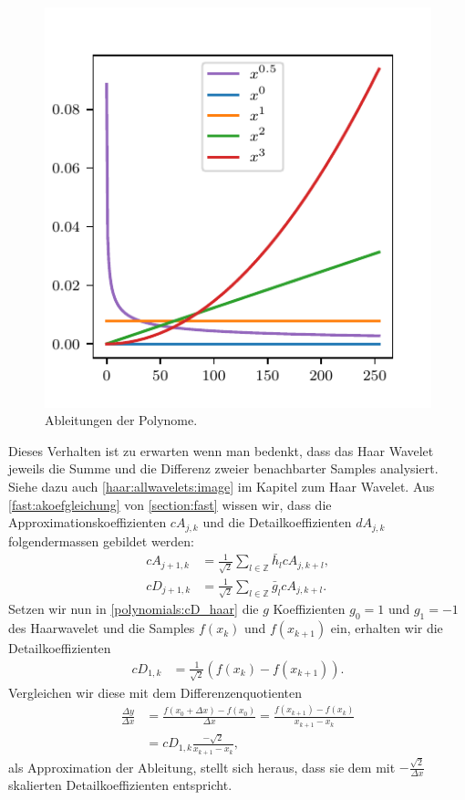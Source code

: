 \begin{refsection}
\begin{figure}
    \centering
    \includegraphics{papers/polynomials/images/polynomials_signals_diff.pdf}
    \caption{Ableitungen der Polynome.\label{polynomials:diff}}
\end{figure}

Dieses Verhalten ist zu erwarten wenn man bedenkt, dass das Haar Wavelet
%
jeweils die Summe und die Differenz zweier benachbarter Samples analysiert.
Siehe dazu auch \cref{haar:allwavelets:image} im Kapitel zum Haar Wavelet. Aus
\cref{fast:akoefgleichung} von \cref{section:fast} wissen wir, dass die
Approximationskoeffizienten $cA_{j,k}$ und die Detailkoeffizienten $dA_{j,k}$
folgendermassen gebildet werden:
\begin{align}
cA_{j+1,k}
&=
\frac{1}{\sqrt{2}} \sum_{l\in\mathbb Z} \bar{h}_l cA_{j,k+l}, \nonumber
\\
cD_{j+1,k}
&=
\frac{1}{\sqrt{2}} \sum_{l\in\mathbb Z} \bar{g}_l cA_{j,k+l}.
\label{polynomials:cD_haar}
\end{align}
Setzen wir nun in \cref{polynomials:cD_haar} die $g$ Koeffizienten $g_0=1$ und
$g_1=-1$ des Haarwavelet und die Samples $f(x_k)$ und $f(x_{k + 1})$ ein,
erhalten wir die Detailkoeffizienten
\begin{align}
    cD_{1,k} & = \frac{1}{\sqrt{2}}\left(f(x_k) - f(x_{k + 1})\right).
\end{align}
Vergleichen wir diese mit dem Differenzenquotienten
\begin{align}
\frac{\Delta y}{\Delta x} &= \frac{f(x_0+\Delta x) - f(x_0)}{\Delta x}
                           = \frac{f(x_{k+1}) - f(x_k)}{x_{k+1} - x_k} \nonumber \\
                          &= cD_{1,k} \frac{-\sqrt{2}}{x_{k+1} - x_k},
                          \label{polynomials:eq:cD_haar_ableitung}
\end{align}
als Approximation der Ableitung,
%
stellt sich heraus, dass sie dem mit $-\frac{\sqrt{2}}{\Delta x}$ skalierten
Detailkoeffizienten entspricht.


\end{refsection}
